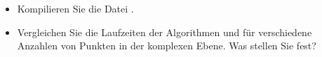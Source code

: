 \begin{aufg}
\begin{itemize}
\item Kompilieren Sie die Datei . 
\item Vergleichen Sie die Laufzeiten der Algorithmen  und
   f\"ur verschiedene Anzahlen von Punkten in der
  komplexen Ebene. Was stellen Sie fest?
\end{itemize}
\end{aufg}